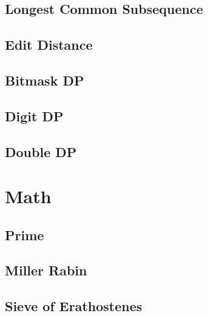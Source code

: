 \documentclass[10pt]{article}
\begin{document}
\begin{multicols*}{2}
\subsection{Longest Common Subsequence}


\subsection{Edit Distance}


\subsection{Bitmask DP}


\subsection{Digit DP}


\subsection{Double DP}



\section{Math}

\subsection{Prime}


\subsection{Miller Rabin}


\subsection{Sieve of Erathostenes}



\end{multicols*}
\end{document}
